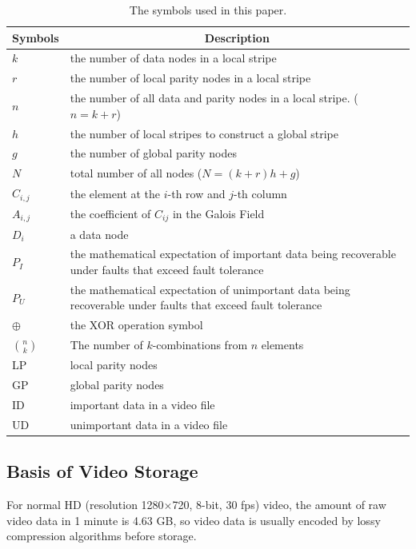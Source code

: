\documentclass[sigconf]{acmart}
\begin{document}
\begin{table}[]\footnotesize
\caption{The symbols used in this paper.}\label{parameter}
\centering
\begin{tabular}{|p{0.7cm}<{\centering}|p{6.5cm}|}
\hline
Symbols & \multicolumn{1}{c|}{Description} \\ \hline \hline
$k$ & the number of data nodes in a local stripe \\ \hline
$r$ & the number of local parity nodes in a local stripe \\ \hline
$n$ & the number of all data and parity nodes in a local stripe. ($n=k+r$) \\ \hline
$h$ & the number of local stripes to construct a global stripe \\ \hline
$g$ & the number of global parity nodes \\ \hline
$N$ & total number of all nodes ($N=(k+r)h+g$) \\ \hline
$C_{i,j}$ & the element at the $i$-th row and $j$-th column \\ \hline
$A_{i,j}$ &  the coefficient of $C_{ij}$ in the Galois Field \\ \hline
$D_i$ & a data node \\ \hline
$P_{I}$ & the mathematical expectation of important data being recoverable under faults that exceed fault tolerance \\ \hline
$P_{U}$ & the mathematical expectation of unimportant data being recoverable under faults that exceed fault tolerance \\ \hline
$\oplus$ & the XOR operation symbol \\ \hline
$\binom{n}{k}$ & The number of $k$-combinations from $n$ elements\\ \hline
LP & local parity nodes \\ \hline
GP & global parity nodes \\ \hline
ID & important data in a video file \\ \hline
UD & unimportant data in a video file \\ \hline
\end{tabular}
\vspace{-3mm}
\end{table}


\subsection{Basis of Video Storage}\label{video storage}
For normal HD (resolution 1280$\times$720, 8-bit, 30 fps) video, the amount of raw video data in 1 minute is 4.63 GB, so video data is usually encoded by lossy compression algorithms before storage.
\end{document}
